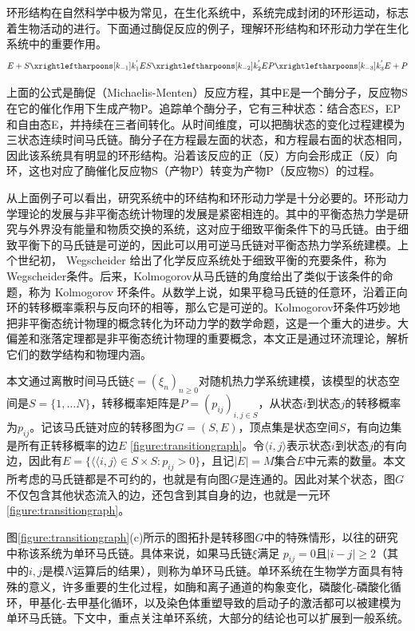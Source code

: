 

环形结构在自然科学中极为常见，在生化系统中，系统完成封闭的环形运动，标志着生物活动的进行。下面通过酶促反应的例子，理解环形结构和环形动力学在生化系统中的重要作用。
\begin{equation*}
    E + S \xrightleftharpoons[k_{-1}]{k^{'}_1}
    ES \xrightleftharpoons[k_{-2}]{k^{'}_2}
    EP \xrightleftharpoons[k_{-3}]{k^{'}_3}
    E + P
\end{equation*}

上面的公式是酶促（Michaelis-Menten）反应方程，其中E是一个酶分子，反应物S在它的催化作用下生成产物P。追踪单个酶分子，它有三种状态：结合态ES，EP和自由态E，并持续在三者间转化。从时间维度，可以把酶状态的变化过程建模为三状态连续时间马氏链。酶分子在方程最左面的状态，和方程最右面的状态相同，因此该系统具有明显的环形结构。沿着该反应的正（反）方向会形成正（反）向环，这也对应了酶催化反应物S（产物P）转变为产物P（反应物S）的过程。

从上面例子可以看出，研究系统中的环结构和环形动力学是十分必要的。环形动力学理论的发展与非平衡态统计物理的发展是紧密相连的。其中的平衡态热力学是研究与外界没有能量和物质交换的系统，这对应于细致平衡条件下的马氏链。由于细致平衡下的马氏链是可逆的，因此可以用可逆马氏链对平衡态热力学系统建模。上个世纪初， Wegscheider 给出了化学反应系统处于细致平衡的充要条件，称为Wegscheider条件。后来，Kolmogorov从马氏链的角度给出了类似于该条件的命题，称为 Kolmogorov 环条件。从数学上说，如果平稳马氏链的任意环，沿着正向环的转移概率乘积与反向环的相等，那么它是可逆的。Kolmogorov环条件巧妙地把非平衡态统计物理的概念转化为环动力学的数学命题，这是一个重大的进步。大偏差和涨落定理都是非平衡态统计物理的重要概念，本文正是通过环流理论，解析它们的数学结构和物理内涵。

本文通过离散时间马氏链$\xi = (\xi_n)_{n \ge 0}$对随机热力学系统建模，该模型的状态空间是$S = \{1, \dots N\}$，转移概率矩阵是$P=(p_{ij})_{i,j \in S}$，从状态$i$到状态$j$的转移概率为$p_{ij}$。记该马氏链对应的转移图为$G=(S, E)$，顶点集是状态空间$S$，有向边集是所有正转移概率的边$E$ \ref{figure:transitiongraph}。令$\langle i, j\rangle$表示状态$i$到状态$j$的有向边，因此有$E = \{\langle \langle i, j\rangle \in S \times S: p_{ij}>0\}$，且记$|E| = M$集合$E$中元素的数量。本文所考虑的马氏链都是不可约的，也就是有向图$G$是连通的。因此对某个状态，图$G$不仅包含其他状态流入的边，还包含到其自身的边，也就是一元环 \ref{figure:transitiongraph}。

图\ref{figure:transitiongraph}(c)所示的图拓扑是转移图$G$中的特殊情形，以往的研究中称该系统为单环马氏链。具体来说，如果马氏链$\xi$满足 $p_{ij}=0$且$|i-j| \ge 2$（其中的$i,j$是模$N$运算后的结果），则称为单环马氏链。单环系统在生物学方面具有特殊的意义，许多重要的生化过程，如酶和离子通道的构象变化\cite{cornish2013fundamentals,sakmann2013single}，磷酸化-磷酸化循环\cite{beard2008chemical}，甲基化-去甲基化循环\cite{jia2017nonequilibrium}，以及染色体重塑导致的启动子的激活\cite{pedraza2008effects,jia2022analytical}都可以被建模为单环马氏链。下文中，重点关注单环系统，大部分的结论也可以扩展到一般系统。

